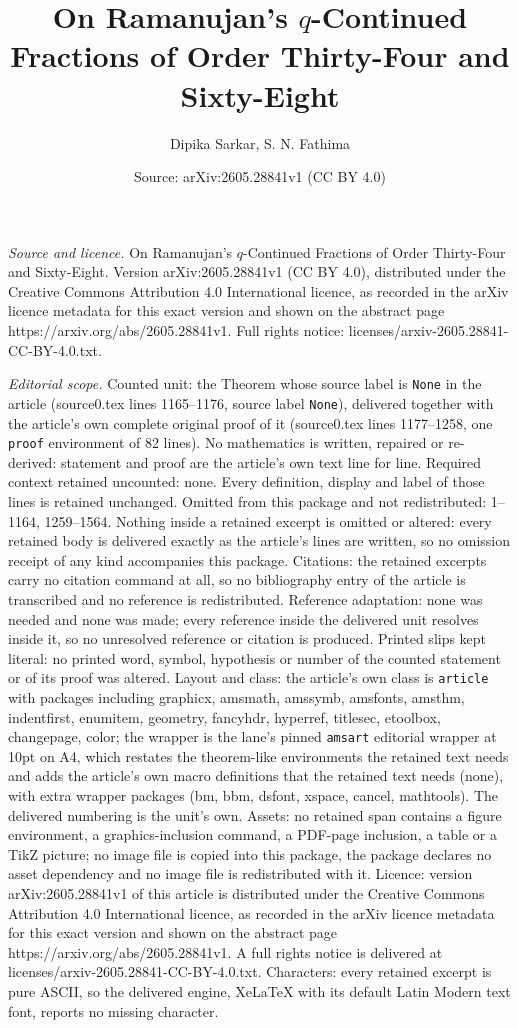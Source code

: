 \documentclass[10pt,a4paper]{amsart}
\title[On Ramanujan's $q$-Continued Fractions of Order Thirty-Four ]{On Ramanujan's $q$-Continued Fractions of Order Thirty-Four and Sixty-Eight}
\author{Dipika Sarkar, S. N. Fathima}
\date{Source: arXiv:2605.28841v1 (CC BY 4.0)}
\begin{document}
\maketitle

\noindent\emph{Source and licence.} On Ramanujan's $q$-Continued Fractions of Order Thirty-Four and Sixty-Eight. Version arXiv:2605.28841v1 (CC BY 4.0), distributed under the Creative Commons Attribution 4.0 International licence, as recorded in the arXiv licence metadata for this exact version and shown on the abstract page https://arxiv.org/abs/2605.28841v1. Full rights notice: licenses/arxiv-2605.28841-CC-BY-4.0.txt.\par\smallskip

\noindent\textit{Editorial scope.} Counted unit: the Theorem whose source label is \texttt{None} in the article (source0.tex lines 1165--1176, source label \texttt{None}), delivered together with the article's own complete original proof of it (source0.tex lines 1177--1258, one \texttt{proof} environment of 82 lines). No mathematics is written, repaired or re-derived: statement and proof are the article's own text line for line. Required context retained uncounted: none. Every definition, display and label of those lines is retained unchanged. Omitted from this package and not redistributed: 1--1164, 1259--1564. Nothing inside a retained excerpt is omitted or altered: every retained body is delivered exactly as the article's lines are written, so no omission receipt of any kind accompanies this package. Citations: the retained excerpts carry no citation command at all, so no bibliography entry of the article is transcribed and no reference is redistributed. Reference adaptation: none was needed and none was made; every reference inside the delivered unit resolves inside it, so no unresolved reference or citation is produced. Printed slips kept literal: no printed word, symbol, hypothesis or number of the counted statement or of its proof was altered. Layout and class: the article's own class is \texttt{article} with packages including graphicx, amsmath, amssymb, amsfonts, amsthm, indentfirst, enumitem, geometry, fancyhdr, hyperref, titlesec, etoolbox, changepage, color; the wrapper is the lane's pinned \texttt{amsart} editorial wrapper at 10pt on A4, which restates the theorem-like environments the retained text needs and adds the article's own macro definitions that the retained text needs (none), with extra wrapper packages (bm, bbm, dsfont, xspace, cancel, mathtools). The delivered numbering is the unit's own. Assets: no retained span contains a figure environment, a graphics-inclusion command, a PDF-page inclusion, a table or a TikZ picture; no image file is copied into this package, the package declares no asset dependency and no image file is redistributed with it. Licence: version arXiv:2605.28841v1 of this article is distributed under the Creative Commons Attribution 4.0 International licence, as recorded in the arXiv licence metadata for this exact version and shown on the abstract page https://arxiv.org/abs/2605.28841v1. A full rights notice is delivered at licenses/arxiv-2605.28841-CC-BY-4.0.txt. Characters: every retained excerpt is pure ASCII, so the delivered engine, XeLaTeX with its default Latin Modern text font, reports no missing character.
\end{document}

